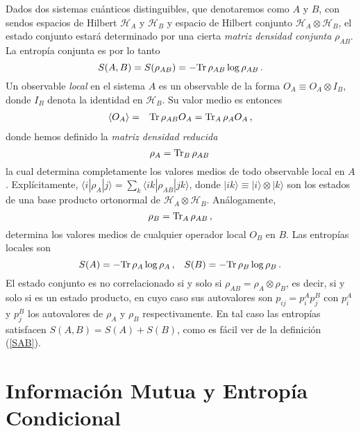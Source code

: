 Dados dos sistemas cuánticos distinguibles, que denotaremos como $A$ y $B$, con sendos espacios de Hilbert $\mathcal{H}_A$ y $\mathcal{H}_B$ 
y espacio de Hilbert conjunto $\mathcal{H}_A\otimes \mathcal{H}_B$, el estado conjunto estará determinado por una cierta {\it 
matriz densidad conjunta} $\rho_{AB}$. La entropía conjunta es por lo tanto
\begin{equation}S(A,B)=S(\rho_{AB})=-{\rm Tr}\,\rho_{AB}\log \rho_{AB}\,.
 \label{SAB}\end{equation}
Un observable {\it local} en el sistema $A$ es un observable de la forma
$O_A\equiv O_A\otimes I_B$, donde $I_B$ denota la identidad en $\mathcal{H}_B$. Su valor
medio es entonces
\begin{eqnarray}
\langle O_A\rangle&=&{\rm Tr}\,\rho_{AB}O_A%
={\rm Tr}_A\, \rho_A O_A\,,
\end{eqnarray}
donde hemos definido la {\it matriz densidad reducida} \cite{NC.00,Wh}
\begin{equation}
 \rho_A={\rm Tr}_B\,\rho_{AB}\label{rhoa}\,\end{equation}
la cual determina completamente los valores medios de todo observable local en $A$.
Explícitamente, $\langle i|\rho_A|j\rangle=\sum_k\langle ik|
\rho_{AB}|jk\rangle$, donde $|ik\rangle\equiv|i\rangle\otimes|k\rangle$ son
los estados de una base producto ortonormal de $\mathcal{H}_A\otimes \mathcal{H}_B$. Análogamente,
\[\rho_B={\rm Tr}_A\,\rho_{AB}\,,\]
determina los valores medios de cualquier operador local $O_B$ en $B$. Las
entropías locales son
\[S(A)=-{\rm Tr}\,\rho_A\log\rho_A\,,\;\;\;
 S(B)=-{\rm Tr}\,\rho_B\log\rho_B\,.\]
El estado conjunto es no correlacionado si y solo si $\rho_{AB}=\rho_A\otimes
\rho_B$, es decir, si y solo si es un estado producto, en cuyo caso
sus autovalores son $p_{ij}=p_i^A p_j^B$ con $p_i^A$ y $p_j^B$ 
los autovalores de $\rho_A$ y $\rho_B$ respectivamente.  
En tal caso las entropías
satisfacen $S(A,B)=S(A)+S(B)$, como es fácil ver de la
definición (\ref{SAB}).
\section{Información  Mutua y Entropía Condicional}

